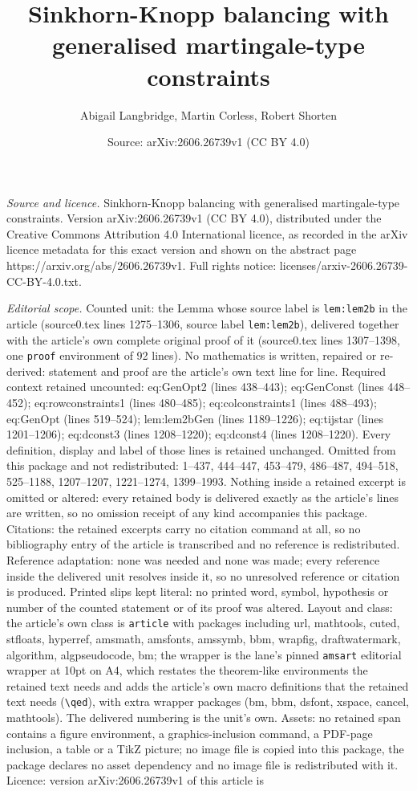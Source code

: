 \documentclass[10pt,a4paper]{amsart}
\title[Sinkhorn-Knopp balancing with generalised martingale-type co]{Sinkhorn-Knopp balancing with generalised martingale-type constraints}
\author{Abigail Langbridge, Martin Corless, Robert Shorten}
\date{Source: arXiv:2606.26739v1 (CC BY 4.0)}
\begin{document}
\maketitle

\noindent\emph{Source and licence.} Sinkhorn-Knopp balancing with generalised martingale-type constraints. Version arXiv:2606.26739v1 (CC BY 4.0), distributed under the Creative Commons Attribution 4.0 International licence, as recorded in the arXiv licence metadata for this exact version and shown on the abstract page https://arxiv.org/abs/2606.26739v1. Full rights notice: licenses/arxiv-2606.26739-CC-BY-4.0.txt.\par\smallskip

\noindent\textit{Editorial scope.} Counted unit: the Lemma whose source label is \texttt{lem:lem2b} in the article (source0.tex lines 1275--1306, source label \texttt{lem:lem2b}), delivered together with the article's own complete original proof of it (source0.tex lines 1307--1398, one \texttt{proof} environment of 92 lines). No mathematics is written, repaired or re-derived: statement and proof are the article's own text line for line. Required context retained uncounted: eq:GenOpt2 (lines 438--443); eq:GenConst (lines 448--452); eq:rowconstraints1 (lines 480--485); eq:colconstraints1 (lines 488--493); eq:GenOpt (lines 519--524); lem:lem2bGen (lines 1189--1226); eq:tijstar (lines 1201--1206); eq:dconst3 (lines 1208--1220); eq:dconst4 (lines 1208--1220). Every definition, display and label of those lines is retained unchanged. Omitted from this package and not redistributed: 1--437, 444--447, 453--479, 486--487, 494--518, 525--1188, 1207--1207, 1221--1274, 1399--1993. Nothing inside a retained excerpt is omitted or altered: every retained body is delivered exactly as the article's lines are written, so no omission receipt of any kind accompanies this package. Citations: the retained excerpts carry no citation command at all, so no bibliography entry of the article is transcribed and no reference is redistributed. Reference adaptation: none was needed and none was made; every reference inside the delivered unit resolves inside it, so no unresolved reference or citation is produced. Printed slips kept literal: no printed word, symbol, hypothesis or number of the counted statement or of its proof was altered. Layout and class: the article's own class is \texttt{article} with packages including url, mathtools, cuted, stfloats, hyperref, amsmath, amsfonts, amssymb, bbm, wrapfig, draftwatermark, algorithm, algpseudocode, bm; the wrapper is the lane's pinned \texttt{amsart} editorial wrapper at 10pt on A4, which restates the theorem-like environments the retained text needs and adds the article's own macro definitions that the retained text needs (\texttt{\textbackslash qed}), with extra wrapper packages (bm, bbm, dsfont, xspace, cancel, mathtools). The delivered numbering is the unit's own. Assets: no retained span contains a figure environment, a graphics-inclusion command, a PDF-page inclusion, a table or a TikZ picture; no image file is copied into this package, the package declares no asset dependency and no image file is redistributed with it. Licence: version arXiv:2606.26739v1 of this article is 
\end{document}
